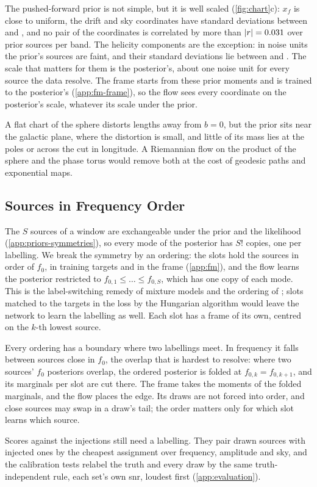 The pushed-forward prior is not simple, but it is well scaled (\cref{fig:chart}c): $x_f$ is close
to uniform, the drift and sky coordinates have standard deviations between \ChartUnitStdLow{} and
\ChartUnitStdHigh{}, and no pair of the \ChartCoords{} coordinates is correlated by more than
$\lvert r\rvert = 0.031{}$ over \ChartPriorDraws{} prior sources per band. The helicity
components are the exception: in noise units the prior's sources are faint, and their standard
deviations lie between \ChartZStdLow{} and \ChartZStdHigh{}. The scale that matters for them is the
posterior's, about one noise unit for every source the data resolve. The frame starts from these
prior moments and is trained to the posterior's (\cref{app:fm-frame}), so the flow sees every
coordinate on the posterior's scale, whatever its scale under the prior.

A flat chart of the sphere distorts lengths away from $b=0$, but the prior sits near the galactic
plane, where the distortion is small, and little of its mass lies at the poles or across the cut in
longitude. A Riemannian flow on the product of the sphere and the phase torus would remove both at
the cost of geodesic paths and exponential maps.

\subsection{Sources in Frequency Order}
\label{app:chart-slots}

The $S$ sources of a window are exchangeable under the prior and the likelihood
(\cref{app:priors-symmetries}), so every mode of the posterior has $S!$ copies, one per labelling.
We break the symmetry by an ordering: the slots hold the sources in order of $f_0$, in training
targets and in the frame (\cref{app:fm}), and the flow learns the posterior restricted to
$f_{0,1}\le\dots\le f_{0,S}$, which has one copy of each mode. This is the label-switching remedy
of mixture models \citep{stephens2000dealing,jasra2005markov} and the ordering of
\citet{delmond2026neural}; slots matched to the targets in the loss by the Hungarian algorithm
\citep{houba2025slotflow} would leave the network to learn the labelling as well. Each slot has a
frame of its own, centred on the $k$-th lowest source.

Every ordering has a boundary where two labellings meet. In frequency it falls between sources
close in $f_0$, the overlap that is hardest to resolve: where two sources' $f_0$ posteriors overlap,
the ordered posterior is folded at $f_{0,k} = f_{0,k+1}$, and its marginals per slot are cut there.
The frame takes the moments of the folded marginals, and the flow places the edge. Its draws are
not forced into order, and close sources may swap in a draw's tail; the order matters only for
which slot learns which source.

Scores against the injections still need a labelling. They pair drawn sources with injected ones
by the cheapest assignment over frequency, amplitude and sky, and the calibration tests relabel
the truth and every draw by the same truth-independent rule, each set's own \ac{snr}, loudest
first (\cref{app:evaluation}).
